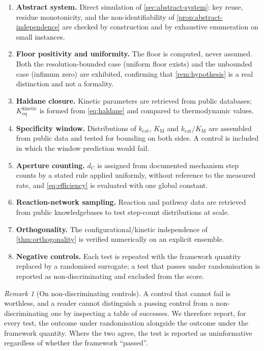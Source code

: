 \documentclass[11pt,twocolumn,a4paper]{article}
\theoremstyle{plain}
\theoremstyle{definition}
\theoremstyle{remark}
\newtheorem{remark}[theorem]{Remark}
\newcommand{\dC}{d_{\mathrm{C}}}
\newcommand{\kcat}{k_{\mathrm{cat}}}
\newcommand{\KM}{K_{\mathrm{M}}}
\newcommand{\Keq}{K_{\mathrm{eq}}}
\begin{document}
\begin{enumerate}[label=\textbf{V\arabic*.},leftmargin=3em,itemsep=0.4em]
\item \textbf{Abstract system.} Direct simulation of
\cref{sec:abstract-system}: key reuse, residue monotonicity, and the
non-identifiability of \cref{prop:abstract-independence} are checked by
construction and by exhaustive enumeration on small instances.
\item \textbf{Floor positivity and uniformity.} The floor is computed, never
assumed. Both the resolution-bounded case (uniform floor exists) and the
unbounded case (infimum zero) are exhibited, confirming that
\cref{rem:hypothesis} is a real distinction and not a formality.
\item \textbf{Haldane closure.} Kinetic parameters are retrieved from public
databases; $\Keq^{\text{kinetic}}$ is formed from \cref{eq:haldane} and compared
to thermodynamic values.
\item \textbf{Specificity window.} Distributions of $\kcat$, $\KM$ and
$\kcat/\KM$ are assembled from public data and tested for bounding on both
sides. A control is included in which the window prediction would fail.
\item \textbf{Aperture counting.} $\dC$ is assigned from documented mechanism
step counts by a stated rule applied uniformly, without reference to the
measured rate, and \cref{eq:efficiency} is evaluated with one global constant.
\item \textbf{Reaction-network sampling.} Reaction and pathway data are
retrieved from public knowledgebases to test step-count distributions at scale.
\item \textbf{Orthogonality.} The configurational/kinetic independence of
\cref{thm:orthogonality} is verified numerically on an explicit ensemble.
\item \textbf{Negative controls.} Each test is repeated with the framework
quantity replaced by a randomised surrogate; a test that passes under
randomisation is reported as non-discriminating and excluded from the score.
\end{enumerate}

\begin{remark}[On non-discriminating controls]
\label{rem:controls}
A control that cannot fail is worthless, and a reader cannot distinguish a
passing control from a non-discriminating one by inspecting a table of
successes. We therefore report, for every test, the outcome under randomisation
alongside the outcome under the framework quantity. Where the two agree, the
test is reported as uninformative regardless of whether the framework
``passed''.
\end{remark}
\end{document}
